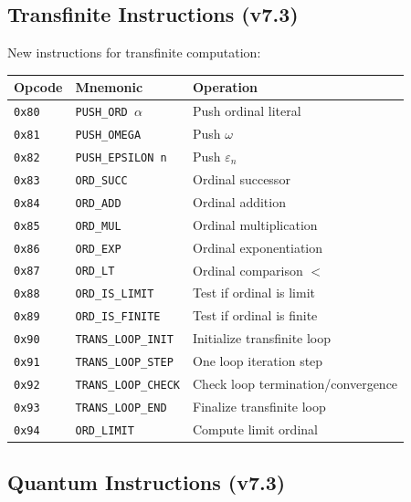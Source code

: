 \subsection{Transfinite Instructions (v7.3)}
\label{subsec:transfinite-instructions}

\begin{definition}
\label{def:transfinite-instructions}
New instructions for transfinite computation:
\begin{center}
\begin{tabular}{llp{6.5cm}}
\toprule
\textbf{Opcode} & \textbf{Mnemonic} & \textbf{Operation} \\
\midrule
\texttt{0x80} & \texttt{PUSH\_ORD $\alpha$} & Push ordinal literal \\
\texttt{0x81} & \texttt{PUSH\_OMEGA} & Push $\omega$ \\
\texttt{0x82} & \texttt{PUSH\_EPSILON n} & Push $\varepsilon_n$ \\
\texttt{0x83} & \texttt{ORD\_SUCC} & Ordinal successor \\
\texttt{0x84} & \texttt{ORD\_ADD} & Ordinal addition \\
\texttt{0x85} & \texttt{ORD\_MUL} & Ordinal multiplication \\
\texttt{0x86} & \texttt{ORD\_EXP} & Ordinal exponentiation \\
\texttt{0x87} & \texttt{ORD\_LT} & Ordinal comparison $<$ \\
\texttt{0x88} & \texttt{ORD\_IS\_LIMIT} & Test if ordinal is limit \\
\texttt{0x89} & \texttt{ORD\_IS\_FINITE} & Test if ordinal is finite \\
\midrule
\texttt{0x90} & \texttt{TRANS\_LOOP\_INIT} & Initialize transfinite loop \\
\texttt{0x91} & \texttt{TRANS\_LOOP\_STEP} & One loop iteration step \\
\texttt{0x92} & \texttt{TRANS\_LOOP\_CHECK} & Check loop termination/convergence \\
\texttt{0x93} & \texttt{TRANS\_LOOP\_END} & Finalize transfinite loop \\
\texttt{0x94} & \texttt{ORD\_LIMIT} & Compute limit ordinal \\
\bottomrule
\end{tabular}
\end{center}
\end{definition}

\subsection{Quantum Instructions (v7.3)}
\label{subsec:quantum-instructions}

